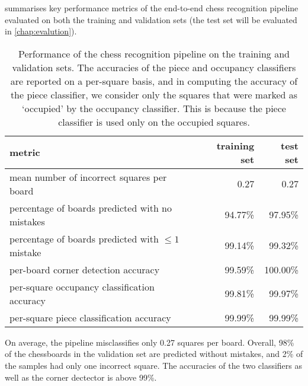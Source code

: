 \documentclass[../main.tex]{subfiles}
\begin{document}
 summarises key performance metrics of the end-to-end chess recognition pipeline evaluated on both the training and validation sets (the test set will be evaluated in \cref{chap:evalution}).
\begin{table}
    \centering
    \begin{tabular}{lrr}
        \toprule
        metric & training set & test set \\
        \midrule
        mean number of incorrect squares per board           & 0.27    & 0.27 \\
        percentage of boards predicted with no mistakes      & 94.77\% & 97.95\%   \\
        percentage of boards predicted with $\leq 1$ mistake & 99.14\% & 99.32\%   \\
        per-board corner detection accuracy                  & 99.59\% & 100.00\% \\
        per-square occupancy classification accuracy         & 99.81\% & 99.97\% \\
        per-square piece classification accuracy             & 99.99\% & 99.99\% \\
        \bottomrule
    \end{tabular}
    \caption[Performance of the chess recognition pipeline on the training and validation sets.]{Performance of the chess recognition pipeline on the training and validation sets. The accuracies of the piece and occupancy classifiers are reported on a per-square basis, and in computing the accuracy of the piece classifier, we consider only the squares that were marked as `occupied' by the occupancy classifier. This is because the piece classifier is used only on the occupied squares.}
    \label{tbl:chess_recognition_trainval_results}
\end{table}
On average, the pipeline misclassifies only 0.27 squares per board.
Overall, 98\% of the chessboards in the validation set are predicted without mistakes, and 2\% of the samples had only one incorrect square.
The accuracies of the two classifiers as well as the corner dectector is above 99\%.
\end{document}
